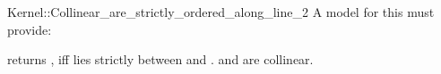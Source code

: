 \begin{ccRefFunctionObjectConcept}{Kernel::Collinear_are_strictly_ordered_along_line_2}
A model for this must provide:


         {returns , iff  lies strictly between 
          and . \ccPrecond {} and 
          are collinear.}

\end{ccRefFunctionObjectConcept}
